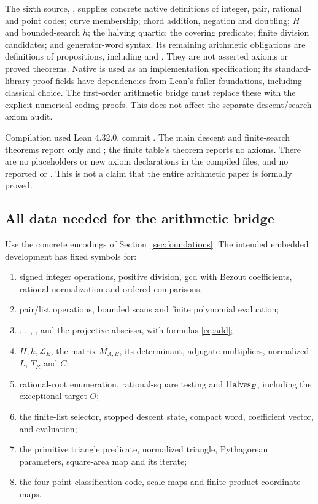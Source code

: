 The sixth source, , supplies concrete native
definitions of integer, pair, rational and point codes; curve membership;
chord addition, negation and doubling; $H$ and bounded-search $h$; the
halving quartic; the covering predicate; finite division candidates; and
generator-word syntax. Its remaining arithmetic obligations are
definitions of propositions, including  and
. They are not asserted axioms or proved
theorems. Native  is used as an implementation specification;
its standard-library proof fields have dependencies from Lean's fuller
foundations, including classical choice. The first-order arithmetic bridge
must replace these with the explicit numerical coding proofs. This does
not affect the separate descent/search axiom audit.

Compilation used Lean 4.32.0, commit
.
The main descent and finite-search theorems report only
 and ; the finite table's
 theorem reports no axioms.
There are no  placeholders or new axiom declarations in the
compiled files, and no reported  or .
This is not a claim that the entire arithmetic paper is formally proved.

\subsection{All data needed for the arithmetic bridge}

Use the concrete encodings of Section~\ref{sec:foundations}.
The intended embedded development has fixed symbols for:

\begin{enumerate}
\item signed integer operations, positive division, gcd with Bezout
coefficients, rational normalization and ordered comparisons;
\item pair/list operations, bounded scans and finite polynomial evaluation;
\item {}, , , ,
and the projective abscissa, with formulas \eqref{eq:add};
\item $H,h,\mathcal L_E$, the matrix $M_{A,B}$, its determinant,
adjugate multipliers, normalized $L$, $T_R$ and $C$;
\item rational-root enumeration, rational-square testing and
$\operatorname{Halves}_E$, including the exceptional target $O$;
\item the finite-list selector, stopped descent state, compact word,
coefficient vector, and evaluation;
\item the primitive triangle predicate, normalized triangle,
Pythagorean parameters, square-area map and its iterate;
\item the four-point classification code, scale maps and finite-product
coordinate maps.
\end{enumerate}

